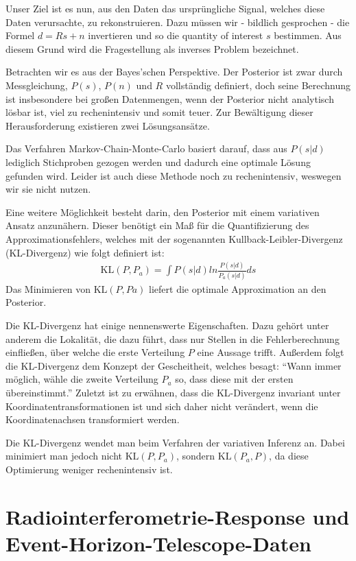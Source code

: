 \documentclass[]{dsadokumentation}
\begin{document}
Unser Ziel ist es nun, aus den Daten das ursprüngliche Signal, welches diese Daten verursachte, zu rekonstruieren. Dazu müssen wir - bildlich gesprochen - die Formel $d=Rs+n$ invertieren und so die quantity of interest $s$ bestimmen. Aus diesem Grund wird die Fragestellung als inverses Problem bezeichnet.

Betrachten wir es aus der Bayes'schen Perspektive. Der Posterior ist zwar durch Messgleichung, $P(s)$, $P(n)$ und $R$ vollständig definiert, doch seine Berechnung ist insbesondere bei großen Datenmengen, wenn der Posterior nicht analytisch lösbar ist, viel zu rechenintensiv und somit teuer. Zur Bewältigung dieser Herausforderung existieren zwei Lösungsansätze.

Das Verfahren Markov-Chain-Monte-Carlo basiert darauf, dass aus $P(s|d)$ lediglich Stichproben gezogen werden und dadurch eine optimale Lösung gefunden wird. Leider ist auch diese Methode noch zu rechenintensiv, weswegen wir sie nicht nutzen.

Eine weitere Möglichkeit besteht darin, den Posterior mit einem variativen Ansatz anzunähern. Dieser benötigt ein Maß für die Quantifizierung des Approximationsfehlers, welches mit der sogenannten Kullback-Leibler-Divergenz (KL-Divergenz) wie folgt definiert ist:
\begin{eqnarray}
\text{KL}(P,P_a) = \int P(s|d) ln \frac{P(s|d)}{P_a(s|d)}ds
\end{eqnarray}
Das Minimieren von $\text{KL}(P, Pa)$ liefert die optimale Approximation an den Posterior.

Die KL-Divergenz hat einige nennenswerte Eigenschaften. Dazu gehört unter anderem die Lokalität, die dazu führt, dass nur Stellen in die Fehlerberechnung einfließen, über welche die erste Verteilung $P$ eine Aussage trifft. Außerdem folgt die KL-Divergenz dem Konzept der Gescheitheit, welches besagt: \enquote{Wann immer möglich, wähle die zweite Verteilung $P_a$ so, dass diese mit der ersten übereinstimmt.} Zuletzt ist zu erwähnen, dass die KL-Divergenz invariant unter Koordinatentransformationen ist und sich daher nicht verändert, wenn die Koordinatenachsen transformiert werden.

Die KL-Divergenz wendet man beim Verfahren der variativen Inferenz an. Dabei minimiert man jedoch nicht $\text{KL}(P, P_a)$, sondern $\text{KL}(P_a, P)$, da diese Optimierung weniger rechenintensiv ist.

\section{Radiointerferometrie-Response und Event-Horizon-Telescope-Daten}
\end{document}
